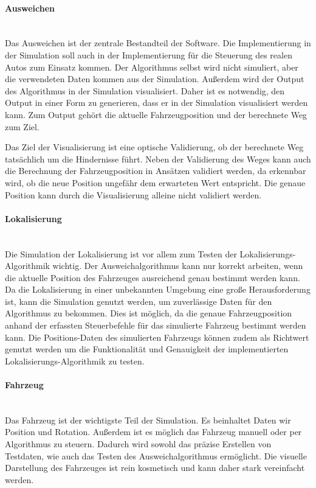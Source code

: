 \paragraph{Ausweichen} \mbox{}\\
Das Ausweichen ist der zentrale Bestandteil der Software.
Die Implementierung in der Simulation soll auch in der Implementierung für die Steuerung des realen Autos zum Einsatz kommen.
Der Algorithmus selbst wird nicht simuliert, aber die verwendeten Daten kommen aus der Simulation. 
Außerdem wird der Output des Algorithmus in der Simulation visualisiert. 
Daher ist es notwendig, den Output in einer Form zu generieren, dass er in der Simulation visualisiert werden kann.
Zum Output gehört die aktuelle Fahrzeugposition und der berechnete Weg zum Ziel.

Das Ziel der Visualisierung ist eine optische Validierung, ob der berechnete Weg tatsächlich um die Hindernisse führt. 
Neben der Validierung des Weges kann auch die Berechnung der Fahrzeugposition in Ansätzen validiert werden, da erkennbar wird,
ob die neue Position ungefähr dem erwarteten Wert entspricht. Die genaue Position kann durch die Visualisierung alleine nicht validiert werden.

\paragraph{Lokalisierung} \mbox{}\\
Die Simulation der Lokalisierung ist vor allem zum Testen der Lokalisierungs-Algorithmik wichtig. 
Der Ausweichalgorithmus kann nur korrekt arbeiten, wenn die aktuelle Position des Fahrzeuges ausreichend genau bestimmt werden kann.
Da die Lokalisierung in einer unbekannten Umgebung eine große Herausforderung ist, 
kann die Simulation genutzt werden, um zuverlässige Daten für den Algorithmus zu bekommen. 
Dies ist möglich, da die genaue Fahrzeugposition anhand der erfassten Steuerbefehle für das simulierte Fahr\-zeug bestimmt werden kann.
Die Positions-Daten des simulierten Fahrzeugs können zudem als Richtwert genutzt werden
um die Funktionalität und Ge\-nauigkeit der implementierten Lokalisierungs-Algorithmik zu testen.

\paragraph{Fahrzeug} \mbox{}\\
Das Fahrzeug ist der wichtigste Teil der Simulation.
Es beinhaltet Daten wir Position und Rotation.
Außerdem ist es möglich das Fahrzeug manuell oder per Algorithmus zu steuern.
Dadurch wird sowohl das präzise Erstellen von Testdaten, wie auch das Testen des Ausweichalgorithmus ermöglicht.
Die visuelle Darstellung des Fahrzeuges ist rein kosmetisch und kann daher stark vereinfacht werden. 

